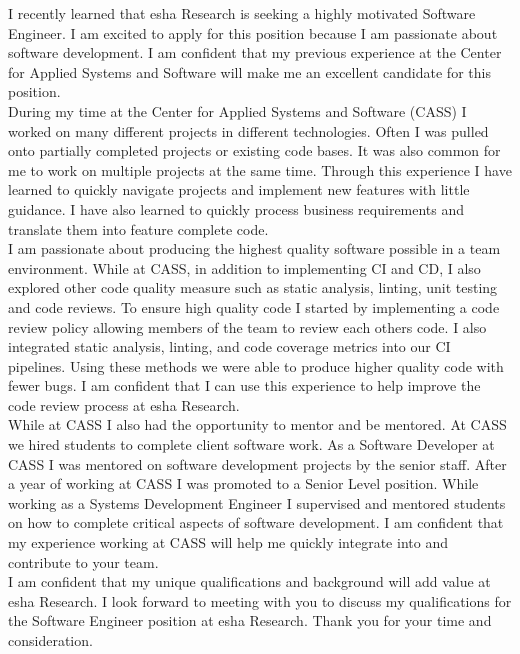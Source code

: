\documentclass[11pt, a4paper]{awesome-cv}
\begin{document}
\makecvheader

\makelettertitle



\begin{cvletter}
    I recently learned that esha Research is seeking a highly motivated Software Engineer. I am excited to apply for this position because I am passionate about software development. I am confident that my previous experience at the Center for Applied Systems and Software will make me an excellent candidate for this position.\\
    
    During my time at the Center for Applied Systems and Software (CASS) I worked on many different projects in different technologies. Often I was pulled onto partially completed projects or existing code bases. It was also common for me to work on multiple projects at the same time. Through this experience I have learned to quickly navigate projects and implement new features with little guidance. I have also learned to quickly process business requirements and translate them into feature complete code.\\
    
    I am passionate about producing the highest quality software possible in a team environment. While at CASS, in addition to implementing CI and CD, I also explored other code quality measure such as static analysis, linting, unit testing and code reviews. To ensure high quality code I started by implementing a code review policy allowing members of the team to review each others code. I also integrated static analysis, linting, and code coverage metrics into our CI pipelines. Using these methods we were able to produce higher quality code with fewer bugs. I am confident that I can use this experience to help improve the code review process at esha Research.\\
    
    While at CASS I also had the opportunity to mentor and be mentored. At CASS we hired students to complete client software work. As a Software Developer at CASS I was mentored on software development projects by the senior staff. After a year of working at CASS I was promoted to a Senior Level position. While working as a Systems Development Engineer I supervised and mentored students on how to complete critical aspects of software development. I am confident that my experience working at CASS will help me quickly integrate into and contribute to your team.\\
    
    I am confident that my unique qualifications and background will add value at esha Research. I look forward to meeting with you to discuss my qualifications for the Software Engineer position at esha Research. Thank you for your time and consideration.\\
    

\end{cvletter}

\makeletterclosing
\end{document}
